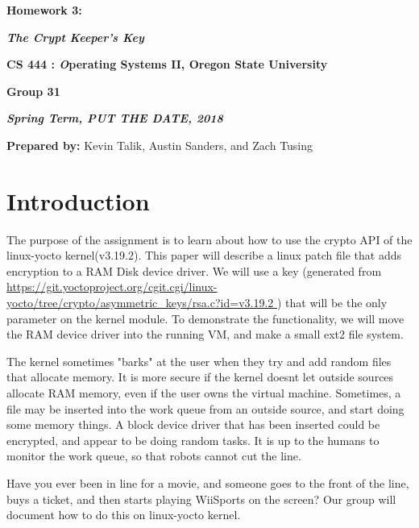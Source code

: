 \documentclass[onecolumn, draftclsnofoot,10pt, compsoc]{IEEEtran}
\def \GroupMemberOne{			Kevin Talik}
\def \GroupMemberTwo{			Austin Sanders}
\def \GroupMemberThree{			Zach Tusing}
\begin{document}
 	\begin{center}
	\huge\bf{ Homework 3:} 
   
    \large\textbf{\textit{ The Crypt Keeper's Key }}\par
     
    
    
	\small{\bf CS 444 : \textit Operating Systems II, Oregon State University}\par
    \small{\bf{Group 31}}
    
    
    {\bf\textit{ Spring Term, PUT THE DATE, 2018} }
    
    
    {\small {\bf Prepared by:} \GroupMemberOne, \GroupMemberTwo, and \GroupMemberThree }
        \end{center}
 		\vfill

       \pagebreak
       \section{ Introduction}
	The purpose of the assignment is to learn about how to use the crypto API of the linux-yocto kernel(v3.19.2). 
	This paper will describe a linux patch file that adds encryption to a RAM Disk device driver.
	We will use a key (generated from \url{https://git.yoctoproject.org/cgit.cgi/linux-yocto/tree/crypto/asymmetric_keys/rsa.c?id=v3.19.2 } ) that will be the only parameter on the kernel module.
	To demonstrate the functionality, we will move the RAM device driver into the running VM, and make a small ext2 file system. 

	The kernel sometimes "barks" at the user when they try and add random files that allocate memory. It is more secure if the kernel doesnt let outside sources allocate RAM memory, even if the user owns the virtual machine.
	Sometimes, a file may be inserted into the work queue from an outside source, and start doing some memory things.
	A block device driver that has been inserted could be encrypted, and appear to be doing random tasks.
	It is up to the humans to monitor the work queue, so that robots cannot cut the line. 

	Have you ever been in line for a movie, and someone goes to the front of the line, buys a ticket, and then starts playing WiiSports on the screen? 
	Our group will document how to do this on linux-yocto kernel.
	
\end{document}
